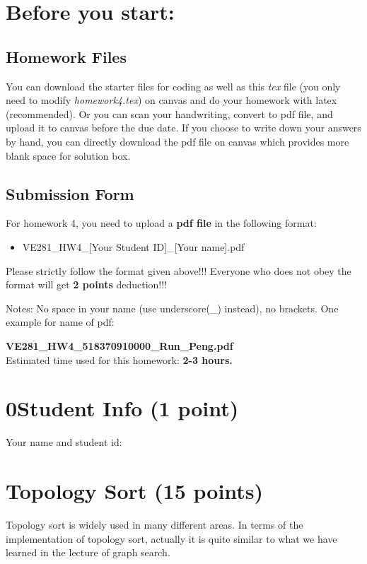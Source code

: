 \documentclass[11pt]{exam}
\begin{document}
\setlength{\parindent}{0pt}
\section*{Before you start:}

\subsection*{Homework Files}
You can download the starter files for coding as well as this \textit{tex} file (you only need to modify \textit{homework4.tex}) on canvas and do your homework with latex (recommended). Or you can scan your handwriting, convert to pdf file, and upload it to canvas before the due date. If you choose to write down your answers by hand, you can directly download the pdf file on canvas which provides more blank space for solution box.\\

\subsection*{Submission Form}
For homework 4, you need to upload a \textbf{pdf file} in the following format:
\begin{itemize}
\item VE281\_HW4\_[Your Student ID]\_[Your name].pdf
\end{itemize}
{\color{red}Please strictly follow the format given above!!! Everyone who does not obey the format will get \textbf{2 points} deduction!!!}

Notes: No space in your name (use underscore(\_) instead), no brackets. One example for name of pdf:

\textbf{VE281\_HW4\_518370910000\_Run\_Peng.pdf}\\



Estimated time used for this homework: \textbf{2-3 hours.}

\newpage
\section*{0\quad Student Info (1 point)}
Your name and student id:
\begin{solution}
\end{solution}

\section{Topology Sort (15 points)}
Topology sort is widely used in many different areas. In terms of the implementation of topology sort, actually it is quite similar to what we have learned in the lecture of graph search. \\
\end{document}
